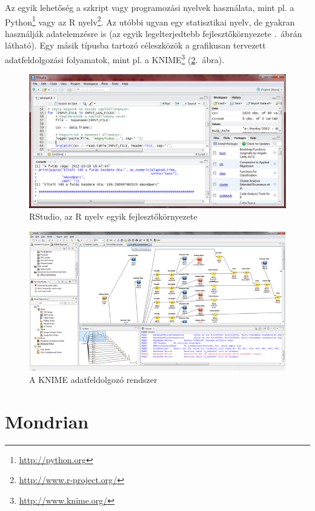 \documentclass[a4paper,10pt,titlepage]{article}
\begin{document}
Az egyik lehetőség a szkript vagy programozási nyelvek használata, mint pl. a Python\footnote{\url{http://python.org}} vagy az R nyelv\footnote{\url{http://www.r-project.org/}}. Az utóbbi ugyan egy statisztikai nyelv, de gyakran használják adatelemzésre is (az egyik legelterjedtebb fejlesztőkörnyezete .~ábrán látható). Egy másik típusba tartozó céleszközök a grafikusan tervezett adatfeldolgozási folyamatok, mint pl. a KNIME\footnote{\url{http://www.knime.org/}} (\ref{fig:knime}.~ábra). 

\begin{figure}[h!]
\centering
\includegraphics[width=1.00\textwidth]{figures/RStudio.png}
\caption{RStudio, az R nyelv egyik fejlesztőkörnyezete \label{fig:RStudio}}
\end{figure}

\begin{figure}[h!]
\centering
\includegraphics[width=1.00\textwidth]{figures/knime.png}
\caption{A KNIME adatfeldolgozó rendszer \label{fig:knime}}
\end{figure}

\section{Mondrian}
\end{document}
